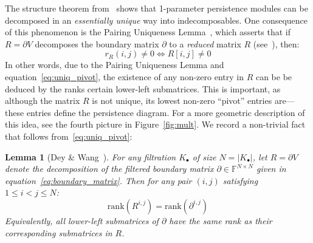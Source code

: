 \documentclass[10pt]{article}
\numberwithin{equation}{section}
\newcommand{\+}{%
	\raisebox{0.18ex}{\scaleobj{0.55}{+}}
}
\newtheorem{lemma}{Lemma}
\theoremstyle{definition}
\begin{document}
The structure theorem from~\cite{zomorodian2004computing} shows that 1-parameter persistence modules can be decomposed in an \emph{essentially unique} way into indecomposables. One consequence of this phenomenon is the Pairing Uniqueness Lemma~\cite{cohen2006vines}, which asserts that if $R = \partial V$ decomposes the boundary matrix $\partial$ to a \emph{reduced} matrix $R$ (see~\cite{dey2022computational, edelsbrunner2000topological}), then:  
\begin{equation}\label{eq:uniq_pivot}
r_R(i,j) \neq 0 \Leftrightarrow R[i,j] \neq 0
\end{equation}
In other words, due to the Pairing Uniqueness Lemma and equation~\eqref{eq:uniq_pivot}, the existence of any non-zero entry in $R$ can be be deduced by the ranks certain lower-left submatrices.   
This is important, as although the matrix $R$ is not unique, its lowest non-zero ``pivot'' entries are---these entries define the persistence diagram. 
For a more geometric description of this idea, see the fourth picture in Figure~\ref{fig:mult}.
We record a non-trivial fact that follows from~\eqref{eq:uniq_pivot}: 
\begin{lemma}[Dey \& Wang~\cite{dey2022computational}]\label{lemma:rank}
For any filtration $K_\bullet$ of size $N = \lvert K_\bullet \rvert$, let $R = \partial V$ denote the decomposition of the filtered boundary matrix $\partial \in \mathbb{F}^{N \times N}$ given in equation~\ref{eq:boundary_matrix}. Then for any pair $(i,j)$ satisfying $1 \leq i < j \leq N$:
	\begin{equation}\label{eq:lower_left_rank}
		\mathrm{rank}(R^{i,j}) = \mathrm{rank}(\partial^{i, j})
	\end{equation}
Equivalently, all lower-left submatrices of $\partial$ have the same rank as their corresponding submatrices in $R$. 
\end{lemma}
\noindent
\end{document}
